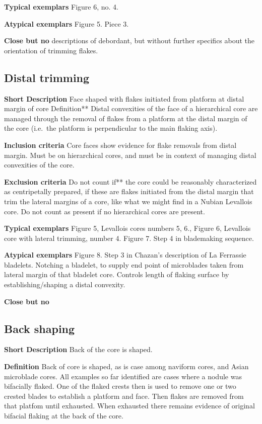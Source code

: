 \documentclass[
]{article}
\begin{document}
\textbf{Typical exemplars} Figure 6, no. 4.

\textbf{Atypical exemplars} Figure 5. Piece 3.

\textbf{Close but no} descriptions of debordant, but without further
specifics about the orientation of trimming flakes.

\hypertarget{distal-trimming}{%
\subsection{Distal trimming}\label{distal-trimming}}

\textbf{Short Description} Face shaped with flakes initiated from
platform at distal margin of core Definition** Distal convexities of the
face of a hierarchical core are managed through the removal of flakes
from a platform at the distal margin of the core (i.e.~the platform is
perpendicular to the main flaking axis).

\textbf{Inclusion criteria} Core faces show evidence for flake removals
from distal margin. Must be on hierarchical cores, and must be in
context of managing distal convexities of the core.

\textbf{Exclusion criteria} Do not count if** the core could be
reasonably characterized as centripetally prepared, if these are flakes
initiated from the distal margin that trim the lateral margins of a
core, like what we might find in a Nubian Levallois core. Do not count
as present if no hierarchical cores are present.

\textbf{Typical exemplars} Figure 5, Levallois cores numbers 5, 6.,
Figure 6, Levallois core with lateral trimming, number 4. Figure 7. Step
4 in blademaking sequence.

\textbf{Atypical exemplars} Figure 8. Step 3 in Chazan's description of
La Ferrassie bladelets. Notching a bladelet, to supply end point of
microblades taken from lateral margin of that bladelet core. Controls
length of flaking surface by establishing/shaping a distal convexity.

\textbf{Close but no}

\hypertarget{back-shaping}{%
\subsection{Back shaping}\label{back-shaping}}

\textbf{Short Description} Back of the core is shaped.

\textbf{Definition} Back of core is shaped, as is case among naviform
cores, and Asian microblade cores. All examples so far identified are
cases where a nodule was bifacially flaked. One of the flaked crests
then is used to remove one or two crested blades to establish a platform
and face. Then flakes are removed from that platfom until exhausted.
When exhausted there remains evidence of original bifacial flaking at
the back of the core.
\end{document}
